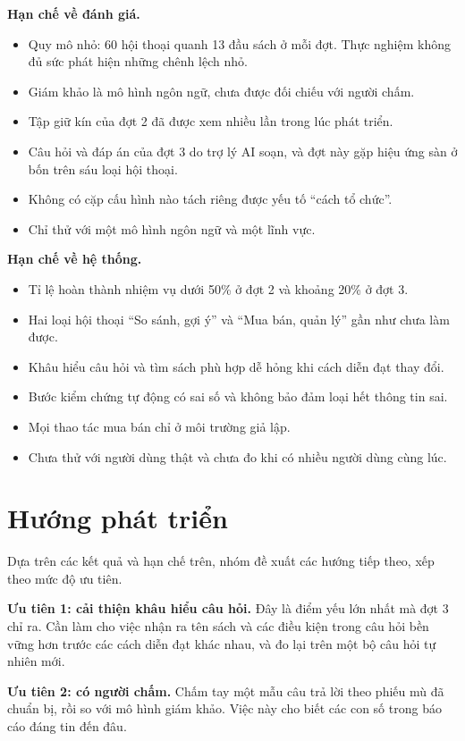 \textbf{Hạn chế về đánh giá.}
\begin{itemize}
    \item Quy mô nhỏ: 60 hội thoại quanh 13 đầu sách ở mỗi đợt. Thực nghiệm không đủ sức phát hiện những chênh lệch nhỏ.
    \item Giám khảo là mô hình ngôn ngữ, chưa được đối chiếu với người chấm.
    \item Tập giữ kín của đợt 2 đã được xem nhiều lần trong lúc phát triển.
    \item Câu hỏi và đáp án của đợt 3 do trợ lý AI soạn, và đợt này gặp hiệu ứng sàn ở bốn trên sáu loại hội thoại.
    \item Không có cặp cấu hình nào tách riêng được yếu tố ``cách tổ chức''.
    \item Chỉ thử với một mô hình ngôn ngữ và một lĩnh vực.
\end{itemize}

\textbf{Hạn chế về hệ thống.}
\begin{itemize}
    \item Tỉ lệ hoàn thành nhiệm vụ dưới 50\% ở đợt 2 và khoảng 20\% ở đợt 3.
    \item Hai loại hội thoại ``So sánh, gợi ý'' và ``Mua bán, quản lý'' gần như chưa làm được.
    \item Khâu hiểu câu hỏi và tìm sách phù hợp dễ hỏng khi cách diễn đạt thay đổi.
    \item Bước kiểm chứng tự động có sai số và không bảo đảm loại hết thông tin sai.
    \item Mọi thao tác mua bán chỉ ở môi trường giả lập.
    \item Chưa thử với người dùng thật và chưa đo khi có nhiều người dùng cùng lúc.
\end{itemize}

\section{Hướng phát triển}

Dựa trên các kết quả và hạn chế trên, nhóm đề xuất các hướng tiếp theo, xếp theo mức độ ưu tiên.

\textbf{Ưu tiên 1: cải thiện khâu hiểu câu hỏi.} Đây là điểm yếu lớn nhất mà đợt 3 chỉ ra. Cần làm cho việc nhận ra tên sách và các điều kiện trong câu hỏi bền vững hơn trước các cách diễn đạt khác nhau, và đo lại trên một bộ câu hỏi tự nhiên mới.

\textbf{Ưu tiên 2: có người chấm.} Chấm tay một mẫu câu trả lời theo phiếu mù đã chuẩn bị, rồi so với mô hình giám khảo. Việc này cho biết các con số trong báo cáo đáng tin đến đâu.


